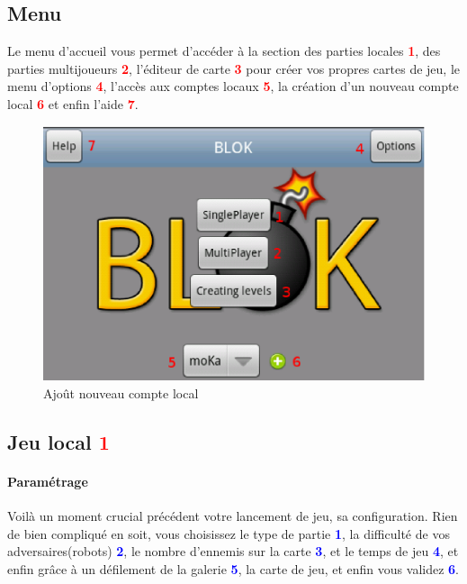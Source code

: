 \subsection{Menu}	
	Le menu d'accueil vous permet d'accéder à la section des parties locales
	\textcolor{red}{\textbf{1}}, des parties multijoueurs
	\textcolor{red}{\textbf{2}}, l'éditeur de carte \textcolor{red}{\textbf{3}}
	pour créer vos propres cartes de jeu, le menu d'options
	\textcolor{red}{\textbf{4}}, l'accès aux comptes locaux
	\textcolor{red}{\textbf{5}}, la création d'un nouveau compte local
	\textcolor{red}{\textbf{6}} et enfin l'aide \textcolor{red}{\textbf{7}}.
	\begin{figure}[H]
		\centering
			\includegraphics[scale=0.7]{Manuel/Img/3}
			\caption{Ajoût nouveau compte local}
	\end{figure}
	
	
	
	\subsection{Jeu local \textcolor{red}{1}}
	\paragraph{Paramétrage\\}
	Voilà un moment crucial précédent votre lancement de jeu, sa configuration.
	Rien de bien compliqué en soit, vous choisissez le type de partie
	\textcolor{blue}{\textbf{1}}, la difficulté de vos adversaires(robots)
	\textcolor{blue}{\textbf{2}}, le nombre d'ennemis sur la carte
	\textcolor{blue}{\textbf{3}}, et le temps de jeu \textcolor{blue}{\textbf{4}},
	et enfin grâce à un défilement de la galerie \textcolor{blue}{\textbf{5}}, la
	carte de jeu, et enfin vous validez \textcolor{blue}{\textbf{6}}.
	
